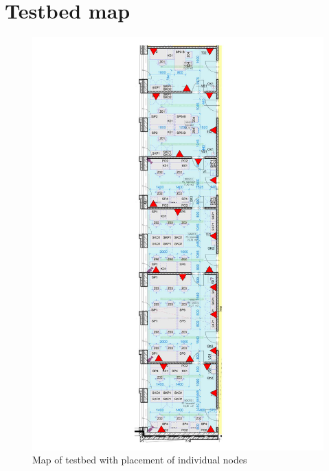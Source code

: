 \documentclass[
  print, %
  table,   %
  nolof,     %
  nolot,     %
           oneside
]{fithesis3}
\begin{document}
\chapter{Testbed map}
\begin{figure}
  \includegraphics[width=\textwidth]{../images/testbed.png}
\caption{Map of testbed with placement of individual nodes}
\label{fig:map}
\end{figure}
\end{document}
